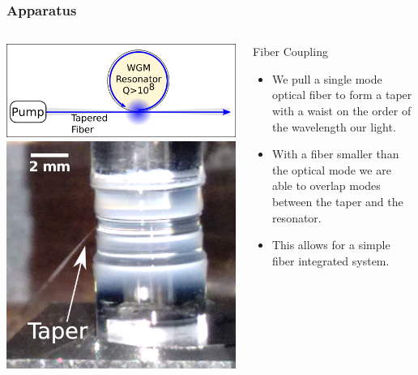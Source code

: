 \documentclass{beamer}
\begin{document}
\begin{frame}\frametitle{Apparatus}
\begin{columns}
\includegraphics[width=1.0\textwidth]{Images/WGM_Resonator_Fig.png}\\
\includegraphics[width=1.0\textwidth]{Images/SBS_Microrod.png}
\begin{block}{Fiber Coupling}
\begin{itemize}
\item We pull a single mode optical fiber to form a taper with a waist on the order of the wavelength our light.
\item With a fiber smaller than the optical mode we are able to overlap modes between the taper and the resonator. 
\item This allows for a simple fiber integrated system.
\end{itemize}
\end{block}
\end{columns}
\end{frame}
\end{document}
